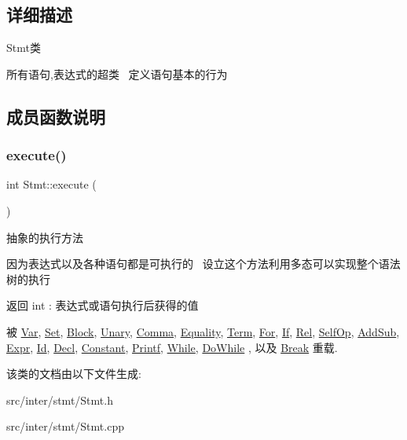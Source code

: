 \subsection{详细描述}
Stmt类 

所有语句,表达式的超类~\newline
定义语句基本的行为 

\subsection{成员函数说明}
\mbox{\label{class_stmt_abdc3261770c3c5bd3ce5b3ba6eedfaa4}} 
\subsubsection{\texorpdfstring{execute()}{execute()}}
{\footnotesize\ttfamily int Stmt\+::execute (\begin{DoxyParamCaption}{ }\end{DoxyParamCaption})\hspace{0.3cm}{\ttfamily [virtual]}}



抽象的执行方法 

因为表达式以及各种语句都是可执行的~\newline
设立这个方法利用多态可以实现整个语法树的执行~\newline
 \begin{DoxyReturn}{返回}
int \+: 表达式或语句执行后获得的值 
\end{DoxyReturn}


被 \hyperlink{class_var_a9dc96e803f7b0f9aa519c2c0e0a6bd8f}{Var}, \hyperlink{class_set_a7776ba36f3af8b09772b36927beb5f5c}{Set}, \hyperlink{class_block_a8e03f15df4e43cd6c802341c3bda6b33}{Block}, \hyperlink{class_unary_af42edff1ee4718a9afeb7127e41af758}{Unary}, \hyperlink{class_comma_aab9ca2bb70a10abd2fb263de745f843a}{Comma}, \hyperlink{class_equality_a0255c33af70613b006b03a329ed329ff}{Equality}, \hyperlink{class_term_ac2d20115da73f9425e5d390856a211a1}{Term}, \hyperlink{class_for_ad099d6d48c640dd5127285e59bbaba15}{For}, \hyperlink{class_if_aeadf929258ccd07a239879c118fb152f}{If}, \hyperlink{class_rel_a82b2f3b75a2b9e81631f2659d42a36d1}{Rel}, \hyperlink{class_self_op_ab452bcad1cd4f1286813b1f737583818}{Self\+Op}, \hyperlink{class_add_sub_a73c0513a31a5400fdfc79ce877a1c3b9}{Add\+Sub}, \hyperlink{class_expr_aff6a2e6eaa460e2a3db28ebdab089b51}{Expr}, \hyperlink{class_id_ae43a9ffecbbc0ac4fd041b8e8e3c3de0}{Id}, \hyperlink{class_decl_ad6495a4245a45dcdcd05e239c8db4a8b}{Decl}, \hyperlink{class_constant_ab5c55607bcff5ce70131a588b6bdbed7}{Constant}, \hyperlink{class_printf_a0343199e28647ced40b9d74a284ff5f3}{Printf}, \hyperlink{class_while_a23b58565983130bb54577f4399ffd822}{While}, \hyperlink{class_do_while_adb6934e033f44c6b52b1079faf1d84cf}{Do\+While} , 以及 \hyperlink{class_break_a554fd4cae05d203145d62868f73004d4}{Break} 重载.



该类的文档由以下文件生成\+:\begin{DoxyCompactItemize}
\item 
src/inter/stmt/Stmt.\+h\item 
src/inter/stmt/Stmt.\+cpp\end{DoxyCompactItemize}

